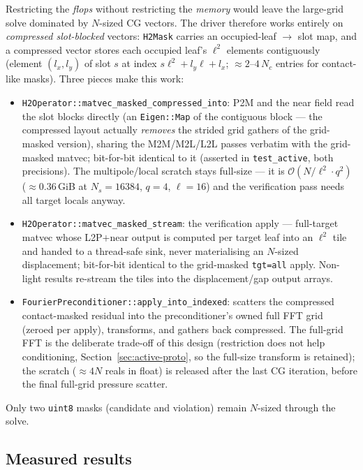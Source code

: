 \documentclass[11pt,a4paper]{article}
\newcommand{\Order}{\mathcal{O}}
\newcommand{\code}[1]{\texttt{#1}}
\theoremstyle{definition}
\theoremstyle{remark}
\begin{document}
Restricting the \emph{flops} without restricting the \emph{memory} would
leave the large-grid solve dominated by $N$-sized CG vectors. The driver
therefore works entirely on \emph{compressed slot-blocked} vectors:
\code{H2Mask} carries an occupied-leaf $\to$ slot map, and a compressed
vector stores each occupied leaf's $\ell^2$ elements contiguously (element
$(l_x,l_y)$ of slot $s$ at index $s\ell^2+l_y\ell+l_x$;
${\approx}2$--$4\,N_c$ entries for contact-like masks). Three pieces make
this work:
\begin{itemize}
\item \code{H2Operator::matvec\_masked\_compressed\_into}: P2M and the near
field read the slot blocks directly (an \code{Eigen::Map} of the contiguous
block --- the compressed layout actually \emph{removes} the strided grid
gathers of the grid-masked version), sharing the M2M/M2L/L2L passes
verbatim with the grid-masked matvec; bit-for-bit identical to it (asserted
in \code{test\_active}, both precisions). The multipole/local scratch stays
full-size --- it is $\Order(N/\ell^2\cdot q^2)$ (${\approx}0.36$\,GiB at
$N_s=16384$, $q=4$, $\ell=16$) and the verification pass needs all target
locals anyway.
\item \code{H2Operator::matvec\_masked\_stream}: the verification apply ---
full-target matvec whose L2P$+$near output is computed per target leaf into
an $\ell^2$ tile and handed to a thread-safe sink, never materialising an
$N$-sized displacement; bit-for-bit identical to the grid-masked
\code{tgt=all} apply. Non-light results re-stream the tiles into the
displacement/gap output arrays.
\item \code{FourierPreconditioner::apply\_into\_indexed}: scatters the
compressed contact-masked residual into the preconditioner's owned full FFT
grid (zeroed per apply), transforms, and gathers back compressed. The
full-grid FFT is the deliberate trade-off of this design (restriction does
not help conditioning, Section~\ref{sec:active-proto}, so the full-size
transform is retained); the scratch (${\approx}4N$ reals in float) is
released after the last CG iteration, before the final full-grid pressure
scatter.
\end{itemize}
Only two \code{uint8} masks (candidate and violation) remain $N$-sized
through the solve.

\subsection{Measured results}
\label{sec:active-measured}
\end{document}
